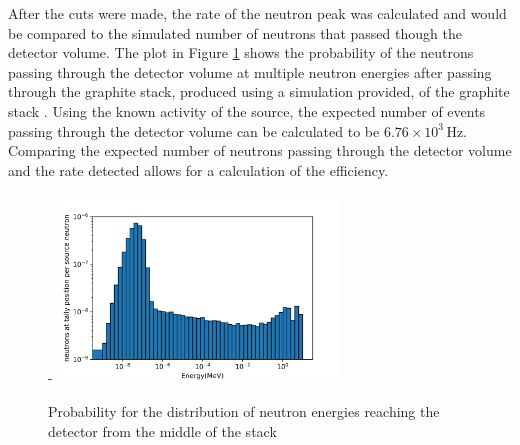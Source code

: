 \documentclass[a4paper]{article}
\begin{document}
\noindent After the cuts were made, the rate of the neutron peak was calculated and would be compared to the simulated number of neutrons that passed though the detector volume. The plot in Figure \ref{fig:prob} shows the probability of the neutrons passing through the detector volume at multiple neutron energies after passing through the graphite stack, produced using a simulation provided, of the graphite stack \cite{Ben}. Using the known activity of the source, the expected number of events passing through the detector volume can be calculated to be  $6.76 \times 10^3$\,Hz. Comparing the expected number of neutrons passing through the detector volume and the rate detected allows for a calculation of the efficiency.
\begin{figure}[H]-
    \centering
    \includegraphics[height=5cm]{hist.png}
    \caption{Probability for the distribution of neutron energies reaching the detector from the middle of the stack \cite{Ben}}
    \label{fig:prob}
\end{figure}
\end{document}
